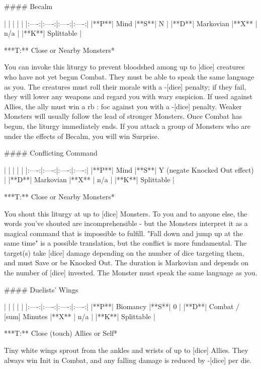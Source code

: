 #### Becalm

| | | | |
|:----:|:----:|:----:|:----:|
|**P**| Mind |**S**|  N |
|**D**| Markovian |**X** |  n/a  |
|**K**| Splittable |


***T:**   Close or Nearby Monsters*



You can invoke this liturgy to prevent bloodshed among up to [dice] creatures who have not yet begun Combat.  They must be able to speak the same language as you.  The creatures must roll their morale with a -[dice] penalty; if they fail, they will lower any weapons and regard you with wary suspicion.  If used against Allies, the ally must win a {rb} : {foc} against you with a -[dice] penalty.  Weaker Monsters will usually follow the lead of stronger Monsters.  Once Combat has begun, the liturgy immediately ends.  If you attack a group of Monsters who are under the effects of Becalm, you will win Surprise.




#### Conflicting Command

| | | | |
|:----:|:----:|:----:|:----:|
|**P**| Mind |**S**|  Y (negate Knocked Out effect) |
|**D**| Markovian |**X** |  n/a  |
|**K**| Splittable |


***T:**   Close or Nearby Monsters*



You shout this liturgy at up to [dice] Monsters.  To you and to anyone else, the words you've shouted are incomprehensible - but the Monsters interpret it as a magical command that is impossible to fulfill.  "Fall down and jump up at the same time" is a possible translation, but the conflict is more fundamental.  The target(s) take [dice] damage depending on the number of dice targeting them, and must Save or be Knocked Out.  The duration is Markovian and depends on the number of [dice] invested.  The Monster must speak the same language as you.






#### Duelists' Wings

| | | | |
|:----:|:----:|:----:|:----:|
|**P**| Biomancy |**S**|  0 |
|**D**| Combat / [sum] Minutes |**X** |  n/a  |
|**K**| Splittable |


***T:**   Close (touch) Allies or Self*



Tiny white wings sprout from the ankles and wrists of up to [dice] Allies.  They always win Init in Combat, and any falling damage is reduced by -[dice] per die.




